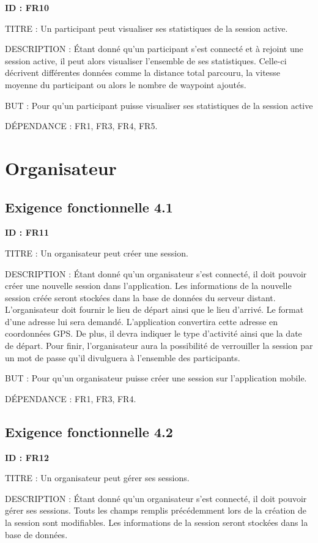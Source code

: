 \documentclass[titlepage, 12pt]{report}
\begin{document}
\textbf{ID : FR10}

TITRE : Un participant peut visualiser ses statistiques de la session active.

DESCRIPTION : Étant donné qu'un participant s'est connecté et à rejoint une session active, il peut alors visualiser l'ensemble de ses statistiques. Celle-ci décrivent différentes données comme la distance total parcouru, la vitesse moyenne du participant ou alors le nombre de waypoint ajoutés. 

BUT : Pour qu'un participant puisse visualiser ses statistiques de la session active

DÉPENDANCE : FR1, FR3, FR4, FR5.


\section{Organisateur}

\subsection{Exigence fonctionnelle 4.1}

\textbf{ID : FR11}

TITRE : Un organisateur peut créer une session.

DESCRIPTION : Étant donné qu'un organisateur s'est connecté, il doit pouvoir créer une nouvelle session dans l'application. Les informations de la nouvelle session créée seront stockées dans la base de données du serveur distant. L'organisateur doit fournir le lieu de départ ainsi que le lieu d'arrivé. Le format d'une adresse lui sera demandé. L'application convertira cette adresse en coordonnées GPS. De plus, il devra indiquer le type d'activité ainsi que la date de départ. Pour finir,  l'organisateur aura la possibilité de verrouiller la session par un mot de passe qu'il divulguera à l'ensemble des participants.

BUT : Pour qu'un organisateur puisse créer une session sur l'application mobile.

DÉPENDANCE : FR1, FR3, FR4.

\subsection{Exigence fonctionnelle 4.2}

\textbf{ID : FR12}

TITRE : Un organisateur peut gérer ses sessions.

DESCRIPTION : Étant donné qu'un organisateur s'est connecté, il doit pouvoir gérer ses sessions. Touts les champs remplis précédemment lors de la création de la session sont modifiables. Les informations de la session seront stockées dans la base de données.
\end{document}
